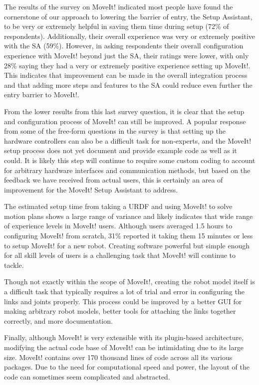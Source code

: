 \documentclass[10pt,journal,compsoc]{joser1}
\begin{document}
{The results of the survey on MoveIt! indicated most people have found the cornerstone of our approach to lowering the barrier of entry, the Setup Assistant, to be very or extremely helpful in saving them time during setup (72\% of respondents). Additionally, their overall experience was very or extremely positive with the SA (59\%). However, in asking respondents their overall configuration experience with MoveIt! beyond just the SA, their ratings were lower, with only 28\% saying they had a very or extremely positive experience setting up MoveIt!. This indicates that improvement can be made in the overall integration process and that adding more steps and features to the SA could reduce even further the entry barrier to MoveIt!. 

From the lower results from this last survey question, it is clear that the setup and configuration process of MoveIt! can still be improved. A popular response from some of the free-form questions in the survey is that setting up the hardware controllers can also be a difficult task for non-experts, and the MoveIt! setup process does not yet document and provide example code as well as it could. It is likely this step will continue to require some custom coding to account for arbitrary hardware interfaces and communication methods, but based on the feedback we have received from actual users, this is certainly an area of improvement for the MoveIt! Setup Assistant to address. 

The estimated setup time from taking a URDF and using MoveIt! to solve motion plans shows a large range of variance and likely indicates that wide range of experience levels in MoveIt! users. Although users averaged 1.5 hours to configuring MoveIt! from scratch, 31\% reported it taking them 15 minutes or less to setup MoveIt! for a new robot. Creating software powerful but simple enough for all skill levels of users is a challenging task that MoveIt! will continue to tackle.

Though not exactly within the scope of MoveIt!, creating the robot model itself is a difficult task that typically requires a lot of trial and error in configuring the links and joints properly. This process could be improved by a better GUI for making arbitrary robot models, better tools for attaching the links together correctly, and more documentation.

Finally, although MoveIt! is very extensible with its plugin-based architecture, modifying the actual code base of MoveIt! can be intimidating due to its large size. MoveIt! contains over 170 thousand lines of code across all its various packages. Due to the need for computational speed and power, the layout of the code can sometimes seem complicated and abstracted. 

}
\end{document}
